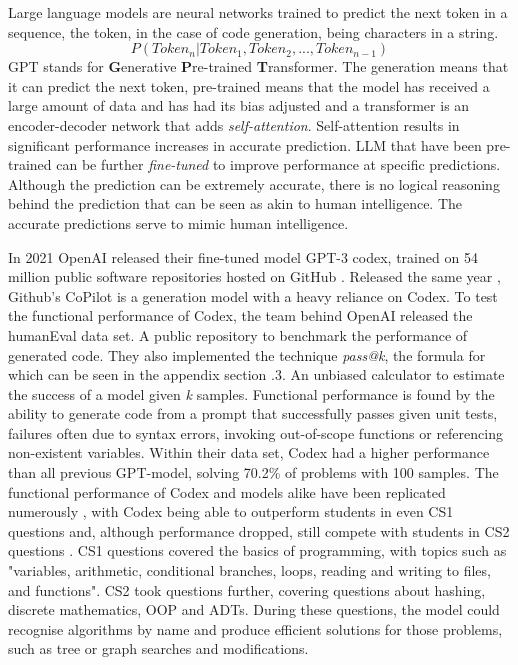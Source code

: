 \documentclass[manuscript,screen,review,sigconf]{acmart}
\begin{document}
Large language models are neural networks trained to predict the next token in a sequence, the token, in the case of code generation, being characters in a string.
\[P(Token_n|Token_1,Token_2,...,Token_{n-1})\]
GPT stands for \textbf{G}enerative \textbf{P}re-trained \textbf{T}ransformer. The generation means that it can predict the next token, pre-trained means that the model has received a large amount of data and has had its bias adjusted and a transformer is an encoder-decoder network that adds \textit{self-attention}. Self-attention results in significant performance increases in accurate prediction. LLM that have been pre-trained can be further \textit{fine-tuned} to improve performance at specific predictions. Although the prediction can be extremely accurate, there is no logical reasoning behind the prediction that can be seen as akin to human intelligence. The accurate predictions serve to mimic human intelligence.


In 2021 OpenAI released their fine-tuned model GPT-3 codex, trained on 54 million public software repositories hosted on GitHub \cite{CodexRelPaper}. Released the same year \cite{GitHub_2021}, Github's CoPilot is a generation model with a heavy reliance on Codex. To test the functional performance of Codex, the team behind OpenAI released the humanEval data set. A public repository to benchmark the performance of generated code. They also implemented the technique \textit{pass@k}, the formula for which can be seen in the appendix section .3. An unbiased calculator to estimate the success of a model given \textit{k} samples. Functional performance is found by the ability to generate code from a prompt that successfully passes given unit tests, failures often due to syntax errors, invoking out-of-scope functions or referencing non-existent variables. Within their data set, Codex had a higher performance than all previous GPT-model, solving 70.2\% of problems with 100 samples. The functional performance of Codex and models alike have been replicated numerously \cite{SysEvaOfLLMofCode, PerformanceParsonProblems, CopilotSuggestionsEval, CoPilotForTeaching}, with Codex being able to outperform students in even CS1 questions and, although performance dropped, still compete with students in CS2 questions \cite{Codex_CS1_CS2_Test}. CS1 questions covered the basics of programming, with topics such as "variables, arithmetic, conditional branches, loops, reading and writing to files, and functions". CS2 took questions further, covering questions about hashing, discrete mathematics, OOP and ADTs. During these questions, the model could recognise algorithms by name and produce efficient solutions for those problems, such as tree or graph searches and modifications.
\end{document}
